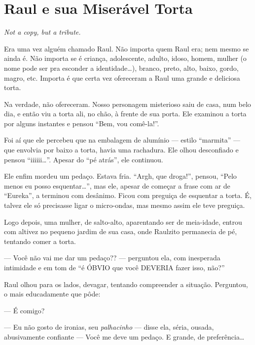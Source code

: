 \chapter{Raul e sua Miserável Torta}

\begin{flushright}
\foreignlanguage{english}{\emph{Not a copy, but a tribute.}}
\end{flushright}

Era uma vez alguém chamado Raul. Não importa quem Raul era; nem mesmo se ainda é. Não importa se é criança, adolescente, adulto, idoso, homem, mulher (o nome pode ser pra esconder a identidade\ldots), branco, preto, alto, baixo, gordo, magro, etc. Importa é que certa vez ofereceram a Raul uma grande e deliciosa torta.

Na verdade, não ofereceram. Nosso personagem misterioso saiu de casa, num belo dia, e então viu a torta ali, no chão, à frente de sua porta. Ele examinou a torta por alguns instantes e pensou ``Bem, vou comê-la!''.

Foi aí que ele percebeu que na embalagem de alumínio --- estilo ``marmita'' --- que envolvia por baixo a torta, havia uma rachadura. Ele olhou desconfiado e pensou ``iiiiii\ldots''. Apesar do ``pé atrás'', ele continuou.

\begin{sloppypar}
Ele enfim mordeu um pedaço. Estava fria. ``Argh, que droga!'', pensou, ``Pelo menos eu posso esquentar\ldots'', mas ele, apesar de começar a frase com ar de ``Eureka'', a terminou com desânimo. Ficou com preguiça de esquentar a torta. É, talvez ele só precisasse ligar o micro-ondas, mas mesmo assim ele teve preguiça.
\end{sloppypar}

Logo depois, uma mulher, de salto-alto, aparentando ser de meia-idade, entrou com altivez no pequeno jardim de sua casa, onde Raulzito permanecia de pé, tentando comer a torta.

--- Você não vai me dar um pedaço?? --- perguntou ela, com inesperada intimidade e em tom de ``é ÓBVIO que você DEVERIA fazer isso, não?''

Raul olhou para os lados, devagar, tentando compreender a situação. Perguntou, o mais educadamente que pôde:

--- É comigo?

--- Eu não gosto de ironias, seu \emph{palhacinho} --- disse ela, séria, ousada, abusivamente confiante --- Você me deve um pedaço. E grande, de preferência\ldots

